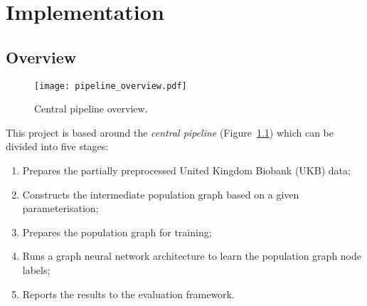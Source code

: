 \chapter{Implementation}


\section{Overview}

\begin{figure}[h]
    \texttt{[image: pipeline\_overview.pdf]}
    \caption{Central pipeline overview.}\label{pipeline-overview}
\end{figure}

This project is based around the \textit{central pipeline} (Figure~\ref{pipeline-overview}) which can be divided into five stages:
\begin{enumerate}
    \item Prepares the partially preprocessed United Kingdom Biobank (UKB) data;
    \item Constructs the intermediate population graph based on a given parameterisation;
    \item Prepares the population graph for training;
    \item Runs a graph neural network architecture to learn the population graph node labels;
    \item Reports the results to the evaluation framework.
\end{enumerate}

